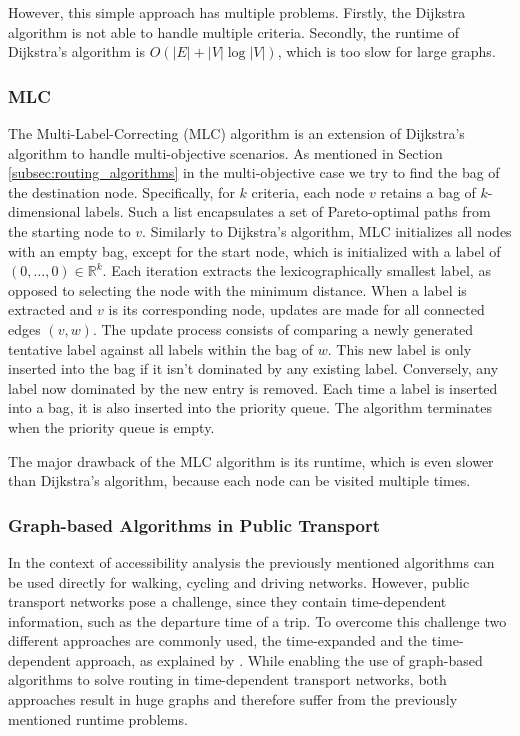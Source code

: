 However, this simple approach has multiple problems.
Firstly, the Dijkstra algorithm is not able to handle multiple criteria.
Secondly, the runtime of Dijkstra's algorithm is \( O(|E| + |V| \log |V|) \), which is too slow for large graphs.

\subsubsection{MLC}
\label{subsubsec:mlc}

The Multi-Label-Correcting (MLC)  algorithm is an extension of Dijkstra's algorithm to handle multi-objective scenarios.
As mentioned in Section \ref{subsec:routing_algorithms} in the multi-objective case we try to find the bag of the destination node.
Specifically, for \(k\) criteria, each node \(v\) retains a bag of \(k\)-dimensional labels. Such a list encapsulates a set of Pareto-optimal paths from the starting node to \(v\).
Similarly to Dijkstra's algorithm, MLC initializes all nodes with an empty bag, except for the start node, which is initialized with a label of \( (0, \dots, 0) \in \mathbb{R}^k \).
Each iteration extracts the lexicographically smallest label, as opposed to selecting the node with the minimum distance.
When a label is extracted and \(v\) is its corresponding node, updates are made for all connected edges \( (v, w) \).
The update process consists of comparing a newly generated tentative label against all labels within the bag of \(w\).
This new label is only inserted into the bag if it isn't dominated by any existing label.
Conversely, any label now dominated by the new entry is removed.
Each time a label is inserted into a bag, it is also inserted into the priority queue.
The algorithm terminates when the priority queue is empty.

The major drawback of the MLC algorithm is its runtime, which is even slower than Dijkstra's algorithm, because each node can be visited multiple times.


\subsubsection{Graph-based Algorithms in Public Transport}
\label{subsubsec:graph_based_algorithms_in_public_transport}


In the context of accessibility analysis the previously mentioned algorithms can be used directly for walking, cycling and driving networks.
However, public transport networks pose a challenge, since they contain time-dependent information, such as the departure time of a trip.
To overcome this challenge two different approaches are commonly used, the time-expanded and the time-dependent approach, as explained by \cite{muller-hannemannTimetableInformationModels2007}.
While enabling the use of graph-based algorithms to solve routing in time-dependent transport networks, both approaches result in huge graphs and therefore suffer from the previously mentioned runtime problems.


